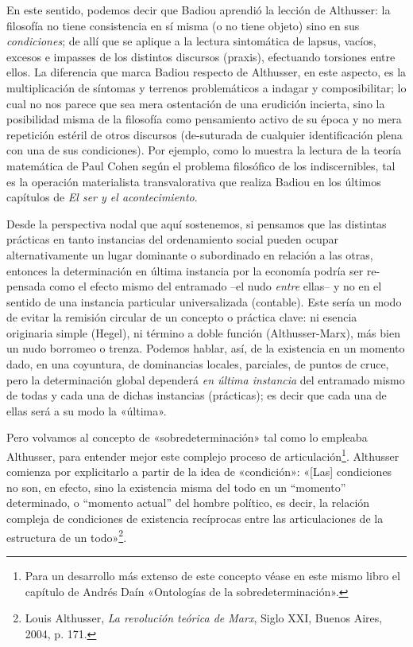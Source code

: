 En este sentido, podemos decir que Badiou aprendió la lección de Althusser: la filosofía no tiene consistencia en sí misma (o no tiene objeto) sino en sus \emph{condiciones}; de allí que se aplique a la lectura sintomática de lapsus, vacíos, excesos e impasses de los distintos discursos (praxis), efectuando torsiones entre ellos. La diferencia que marca Badiou respecto de Althusser, en este aspecto, es la multiplicación de síntomas y terrenos problemáticos a indagar y composibilitar; lo cual no nos parece que sea mera ostentación de una erudición incierta, sino la posibilidad misma de la filosofía como pensamiento activo de su época y no mera repetición estéril de otros discursos (de-suturada de cualquier identificación plena con una de sus condiciones). Por ejemplo, como lo muestra la lectura de la teoría matemática de Paul Cohen según el problema filosófico de los indiscernibles, tal es la operación materialista transvalorativa que realiza Badiou en los últimos capítulos de \emph{El ser y el acontecimiento}.

Desde la perspectiva nodal que aquí sostenemos, si pensamos que las distintas prácticas en tanto instancias del ordenamiento social pueden ocupar alternativamente un lugar dominante o subordinado en relación a las otras, entonces la determinación en última instancia por la economía podría ser re-pensada como el efecto mismo del entramado --el nudo \emph{entre} ellas-- y no en el sentido de una instancia particular universalizada (contable). Este sería un modo de evitar la remisión circular de un concepto o práctica clave: ni esencia originaria simple (Hegel), ni término a doble función (Althusser-Marx), más bien un nudo borromeo o trenza. Podemos hablar, así, de la existencia en un momento dado, en una coyuntura, de dominancias locales, parciales, de puntos de cruce, pero la determinación global dependerá \emph{en última instancia} del entramado mismo de todas y cada una de dichas instancias (prácticas); es decir que cada una de ellas será a su modo la «última».

Pero volvamos al concepto de «sobredeterminación» tal como lo empleaba Althusser, para entender mejor este complejo proceso de articulación\footnote{Para un desarrollo más extenso de este concepto véase en este mismo libro el capítulo de Andrés Daín «Ontologías de la sobredeterminación».}. Althusser comienza por explicitarlo a partir de la idea de «condición»: «{[}Las{]} condiciones no son, en efecto, sino la existencia misma del todo en un ``momento'' determinado, o ``momento actual'' del hombre político, es decir, la relación compleja de condiciones de existencia recíprocas entre las articulaciones de la estructura de un todo»\footnote{Louis Althusser, \emph{La revolución teórica de Marx}, Siglo XXI, Buenos Aires, 2004, p. 171.}.

